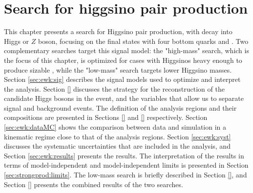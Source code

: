 \chapter{Search for higgsino pair production}
\label{chap:ewk_prod}

This chapter presents a search for Higgsino pair production, with decay into Higgs or $Z$ boson, 
focusing on the final states with four bottom quarks and \met. 
Two complementary searches target this signal model: the "high-mass" search,
which is the focus of this chapter, is optimized for 
cases with Higgsinos heavy enough to produce sizable \met, while the "low-mass" search 
targets lower Higgsino masses.
Section \ref{sec:ewk:sig} describes the signal models used to optimize and interpret the analysis. 
Section \ref{} discusses the strategy for the reconstruction of the candidate Higgs bosons in the event, 
and the variables that allow us to separate signal and background events. 
The definition of the analysis regions and their compositions are presented in Sections \ref{} and 
\ref{} respectively. 
Section \ref{sec:ewk:dataMC} shows the comparison between data and simulation in a kinematic regime close to that of the analysis regions. 
Section \ref{sec:ewk:syst} discusses the systematic uncertainties that are included in the analysis, and Section \ref{sec:ewk:results} 
presents the results. 
The interpretation of the results in terms of model-independent and model-independent limits is presented in Section \ref{sec:strongprod:limits}. 
The low-mass search is briefly described in Section \ref{}, and Section \ref{} 
presents the combined results of the two searches. 








